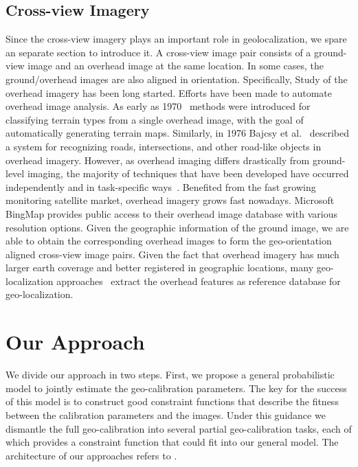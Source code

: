 \subsection{Cross-view Imagery}
Since the cross-view imagery plays an important role in geolocalization,
we spare an separate section to introduce it. A cross-view image
pair consists of a ground-view image and an overhead image at the
same location. In some cases, the ground/overhead images are also
aligned in orientation.
Specifically, Study of the overhead imagery has been long started.
Efforts have been made to automate overhead image analysis. As early
as 1970~\cite{idelsohn1970learning} methods were introduced for
classifying terrain types from a single overhead image, with the goal
of automatically generating terrain maps.  Similarly, in 1976 Bajcsy
et al.~\cite{bajcsy1976computer} described a system for recognizing
roads, intersections, and other road-like objects in overhead imagery.
However, as overhead imaging differs drastically from ground-level
imaging, the majority of techniques that have been developed have
occurred independently and in task-specific ways~\cite{Rozen}.
Benefited from the fast growing monitoring satellite market, overhead
imagery grows fast nowadays. Microsoft BingMap provides public access
to their overhead image database with various resolution options.
Given the geographic information of the ground image, we are able to
obtain the corresponding overhead images to form the geo-orientation
aligned cross-view image pairs.
Given the fact that overhead imagery has much larger earth coverage
and better registered in geographic locations, many geo-localization
approaches~\cite{lin2013cross,lin2015learning,workman2015geocnn,workman2015wide}
extract the overhead features as reference database for
geo-localization.



\section{Our Approach}
We divide our approach in two steps. First, we propose a general
probabilistic model to jointly estimate the geo-calibration
parameters. The key for the success of this model is to construct good
constraint functions that describe the fitness between the calibration
parameters and the images. Under this guidance we dismantle the full
geo-calibration into several partial geo-calibration tasks, each of
which provides a constraint function that could fit into our general
model. The architecture of our approaches refers to
.

